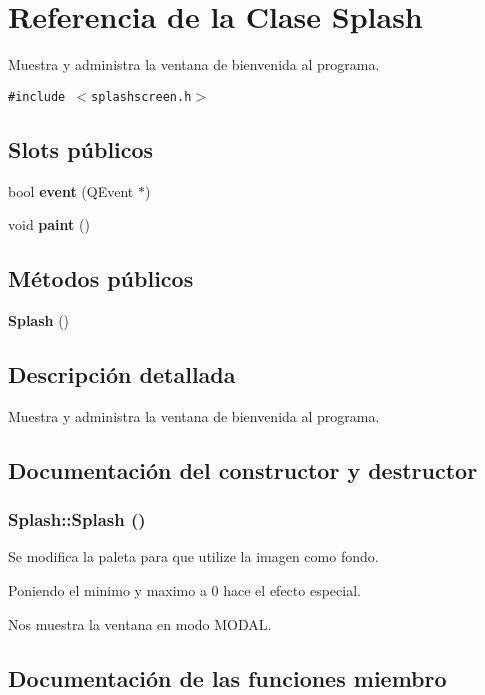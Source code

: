 \section{Referencia de la Clase Splash}
\label{classSplash}
Muestra y administra la ventana de bienvenida al programa.  


{\tt \#include $<$splashscreen.h$>$}

\subsection*{Slots p\'{u}blicos}
\begin{CompactItemize}
\item 
bool {\bf event} (QEvent $\ast$)\label{classSplash_i0}

\item 
void {\bf paint} ()
\end{CompactItemize}
\subsection*{M\'{e}todos p\'{u}blicos}
\begin{CompactItemize}
\item 
{\bf Splash} ()
\end{CompactItemize}


\subsection{Descripci\'{o}n detallada}
Muestra y administra la ventana de bienvenida al programa. 



\subsection{Documentaci\'{o}n del constructor y destructor}
\subsubsection{\setlength{\rightskip}{0pt plus 5cm}Splash::Splash ()}\label{classSplash_a0}


Se modifica la paleta para que utilize la imagen como fondo.

Poniendo el minimo y maximo a 0 hace el efecto especial.

Nos muestra la ventana en modo MODAL. 

\subsection{Documentaci\'{o}n de las funciones miembro}

